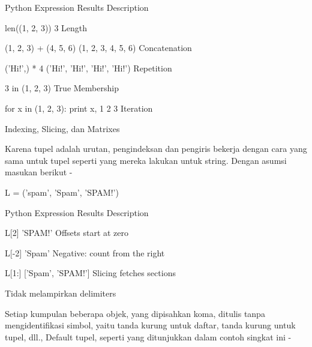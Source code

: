 Python Expression \hspace*{0.5in} Results  \hspace*{0.5in} Description \par
len((1, 2, 3)) \hspace*{0.5in} 3 \hspace*{0.5in} Length \par
(1, 2, 3) + (4, 5, 6) \hspace*{0.5in} (1, 2, 3, 4, 5, 6) \hspace*{0.5in} Concatenation \par
('Hi!',) * 4 \hspace*{0.5in} ('Hi!', 'Hi!', 'Hi!', 'Hi!') \hspace*{0.5in} Repetition \par
3 in (1, 2, 3) \hspace*{0.5in} True \hspace*{0.5in} Membership \par
for x in (1, 2, 3): print x, \hspace*{0.5in} 1 2 3 \hspace*{0.5in} Iteration \par
Indexing, Slicing, dan Matrixes \par
Karena tupel adalah urutan, pengindeksan dan pengiris bekerja dengan cara yang sama untuk tupel seperti yang mereka lakukan untuk string. Dengan asumsi masukan berikut - \par
L = ('spam', 'Spam', 'SPAM!') \par
  \par
Python Expression \hspace*{0.5in} Results  \hspace*{0.5in} Description \par
L[2] \hspace*{0.5in} 'SPAM!' \hspace*{0.5in} Offsets start at zero \par
L[-2] \hspace*{0.5in} 'Spam' \hspace*{0.5in} Negative: count from the right \par
L[1:] \hspace*{0.5in} ['Spam', 'SPAM!'] \hspace*{0.5in} Slicing fetches sections \par
\vspace{12pt}
Tidak melampirkan delimiters \par
Setiap kumpulan beberapa objek, yang dipisahkan koma, ditulis tanpa mengidentifikasi simbol, yaitu tanda kurung untuk daftar, tanda kurung untuk tupel, dll., Default tupel, seperti yang ditunjukkan dalam contoh singkat ini - \par
